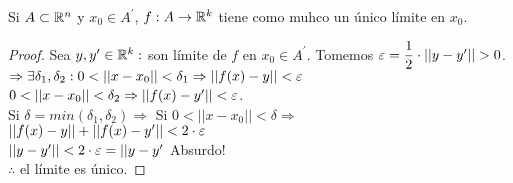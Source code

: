 \begin{lemma}
  Si $A \subset \mathbb{R}^n$ y $x_0 \in A^{\prime}$, $f: A \to \mathbb{R}^k$ tiene como muhco un único límite en $x_0$.
  \begin{proof}
    Sea $y, y^{\prime} \in \mathbb{R}^k : $ son límite de $f$ en $x_0 \in A^{\prime}$. Tomemos $\varepsilon = \dfrac{1}{2} \cdot ||y - y^{\prime}|| > 0$. \\
    $\Rightarrow \exists \delta_1, \delta_2 : 0 < || x - x_0 || < \delta_1 \Rightarrow ||f(x) - y || < \varepsilon$ \\
    $0 < ||x - x_0|| < \delta_2 \Rightarrow ||f(x) - y^{\prime}|| < \varepsilon$. \\
    Si $\delta = min(\delta_1, \delta_2) \Rightarrow$ Si $0 < ||x - x_0|| < \delta \Rightarrow$ \\
    $||f(x) - y|| + ||f(x) - y^{\prime}|| < 2 \cdot \varepsilon$ \\
    $||y - y^{\prime}|| < 2 \cdot \varepsilon = ||y - y^{\prime}$ Absurdo! \\
    $\therefore$ el límite es único.
  \end{proof}
\end{lemma}

